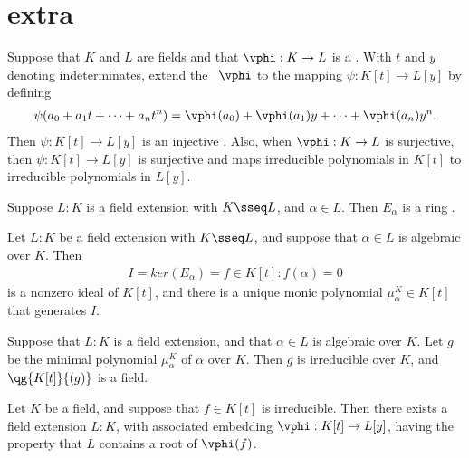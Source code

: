\documentclass[a4paper]{article}
\begin{document}
\section{extra}
\begin{tproposition}
  Suppose that \( K \) and \( L \) are fields and that \( \vphi : K \to L \) is a \homo. With \( t \) and \( y \) denoting indeterminates, extend the \homo~\( \vphi \) to the mapping \( \psi: K[t] \to L[y] \) by defining \begin{align*}
    \psi(a_0 + a_1t+\cdots + a_n t^n) = \vphi(a_0) + \vphi(a_1)y+\cdots + \vphi(a_n)y^n.
  \end{align*}
  Then \( \psi:K[t]\to L[y] \) is an injective \homo.
  Also, when \( \vphi:K\to L \) is surjective, then \( \psi: K[t]\to L[y] \) is surjective and maps irreducible polynomials in \( K[t] \) to irreducible polynomials in \( L[y] \).
\end{tproposition}

\begin{tproposition}
  Suppose \( L: K \) is a field extension with \( K \sseq L \), and \( \alpha\in L \).  Then \( E_\alpha \) is a ring \homo.
\end{tproposition}

\begin{tproposition}
  Let \( L : K \) be a field extension with \( K \sseq L \), and suppose that \( \alpha\in L \) is algebraic over \( K \).
  Then \begin{align*}
    I = ker(E_\alpha) = {f \in K[t] : f(\alpha) = 0}
  \end{align*}
  is a nonzero ideal of \( K[t] \), and there is a unique monic polynomial \( \mu_\alpha^K \in K[t] \) that generates \( I \).
\end{tproposition}


\begin{ttheorem}
  Suppose that \( L : K \) is a field extension, and that \( \alpha\in L \) is algebraic over \( K \).
  Let \( g \) be the minimal polynomial \( \mu_\alpha^K \) of \( \alpha \) over \( K \).
  Then \( g \) is irreducible over \( K \), and \( \qg{K[t]}{(g)} \) is a field.
\end{ttheorem}

\begin{ttheorem}
  Let \( K \) be a field, and suppose that \( f\in K[t] \) is irreducible.
  Then there exists a field extension \( L:K \), with associated embedding \( \vphi:K[t]\to L[y] \), having the property that \( L \) contains a root of \( \vphi(f) \).
\end{ttheorem}
\end{document}
